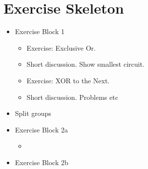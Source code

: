 \section{Exercise Skeleton}
\begin{itemize}
	\item Exercise Block 1
	\begin{itemize}
		\item Exercise: Exclusive Or.
		\item Short discussion. Show smallest circuit.
		\item Exercise: XOR to the Next.
		\item Short discussion. Problems etc
	\end{itemize}
	\item Split groups
	\item Exercise Block 2a
	\begin{itemize}
		\item 
	\end{itemize}
	\item Exercise Block 2b
\end{itemize}